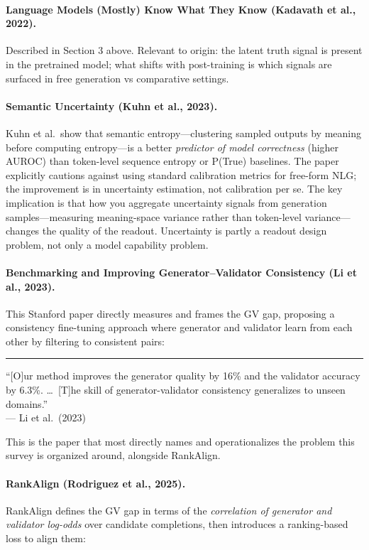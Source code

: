 \documentclass[11pt]{article}
\newenvironment{paperquote}{%
  \vspace{0.5em}%
  \begin{list}{}{%
    \setlength{\leftmargin}{1.5em}%
    \setlength{\rightmargin}{0em}%
    \setlength{\topsep}{0.2em}%
    \setlength{\parsep}{0pt}%
  }%
  \item\relax\small\itshape\leavevmode%
  \hspace{-1.3em}\textcolor{gray!80}{\rule{2pt}{1em}}\hspace{0.5em}%
}{%
  \end{list}%
  \vspace{0.3em}%
}
\begin{document}
\paragraph{Language Models (Mostly) Know What They Know (Kadavath et al., 2022).}
Described in Section 3 above. Relevant to origin: the latent truth signal is present in the pretrained model; what shifts with post-training is which signals are surfaced in free generation vs comparative settings.

\paragraph{Semantic Uncertainty (Kuhn et al., 2023).}
Kuhn et al.\ show that semantic entropy---clustering sampled outputs by meaning before computing entropy---is a better \emph{predictor of model correctness} (higher AUROC) than token-level sequence entropy or P(True) baselines. The paper explicitly cautions against using standard calibration metrics for free-form NLG; the improvement is in uncertainty estimation, not calibration per se. The key implication is that how you aggregate uncertainty signals from generation samples---measuring meaning-space variance rather than token-level variance---changes the quality of the readout. Uncertainty is partly a readout design problem, not only a model capability problem.

\paragraph{Benchmarking and Improving Generator--Validator Consistency (Li et al., 2023).}
This Stanford paper directly measures and frames the GV gap, proposing a consistency fine-tuning approach where generator and validator learn from each other by filtering to consistent pairs:

\begin{paperquote}
\small ``[O]ur method improves the generator quality by 16\% and the validator accuracy by 6.3\%. \ldots\ [T]he skill of generator-validator consistency generalizes to unseen domains.''\\
\hfill --- Li et al.\ (2023)
\end{paperquote}

This is the paper that most directly names and operationalizes the problem this survey is organized around, alongside RankAlign.

\paragraph{RankAlign (Rodriguez et al., 2025).}
RankAlign defines the GV gap in terms of the \emph{correlation of generator and validator log-odds} over candidate completions, then introduces a ranking-based loss to align them:
\end{document}
